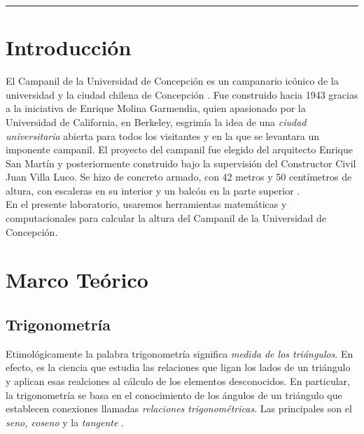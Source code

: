 \documentclass[10pt,a4paper]{article}
\begin{document}
	\begin{center}
		\textcolor{pinegreen}{\rule{150mm}{0.8mm}}
	\end{center}
	
	\begin{multicols}{2}
		\section{Introducción}
			El Campanil de la Universidad de Concepción es un campanario icónico de la universidad y la ciudad chilena de Concepción \cite{wikicamp}. Fue construido hacia 1943 gracias a la iniciativa de Enrique Molina Garmendia, quien apasionado por la Universidad de California, en Berkeley, esgrimía la idea de una \emph{ciudad universitaria} abierta para todos los visitantes y en la que se levantara un imponente campanil. El proyecto del campanil fue elegido del arquitecto Enrique San Martín y posteriormente construido bajo la supervisión del Constructor Civil Juan Villa Luco. Se hizo de concreto armado, con 42 metros y 50 centímetros de altura, con escaleras en su interior y un balcón en la parte superior \cite{campof}.\\
			En el presente laboratorio, usaremos herramientas matemáticas y computacionales para calcular la altura del Campanil de la Universidad de Concepción. 
		\section{Marco Teórico}
		\subsection{Trigonometría}
		Etimológicamente la palabra trigonometría significa \textit{medida de los triángulos}. En efecto, es la ciencia que estudia las relaciones que ligan los lados de un triángulo y aplican esas realciones al cálculo de los elementos desconocidos. En particular, la trigonometría se basa en el conocimiento de los ángulos de un triángulo que establecen conexiones llamadas \textit{relaciones trigonométricas}. Las principales son el \emph{seno, coseno} y la \emph{tangente} \cite{trigonometria}.

\end{multicols}
\end{document}

